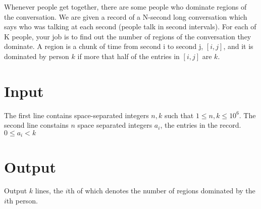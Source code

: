 
Whenever people get together, there are some people who dominate regions of the conversation. We are given a record of a N-second long conversation which says who was talking at each second (people talk in second intervals). For each of K people, your job is to find out the number of regions of the conversation they dominate. A region is a chunk of time from second i to second j, $[i,j]$, and it is dominated by person $k$ if more that half of the entries in $[i,j]$ are $k$.

\section*{Input}
The first line contains space-separated integers $n,k$ such that $1 \leq n,k \leq 10^6$.
The second line constains $n$ space separated integers $a_i$, the entries in the record. $0 \leq a_i < k$

\section*{Output}
Output $k$ lines, the $i$th of which denotes the number of regions dominated by the $i$th person.
